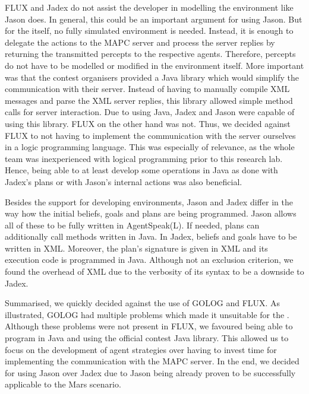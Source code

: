 FLUX and Jadex do not assist the developer in modelling the environment like Jason does.
In general, this could be an important argument for using Jason.
But for the \mars{} itself, no fully simulated environment is needed.
Instead, it is enough to delegate the actions to the MAPC server and process the server replies by returning the transmitted percepts to the respective agents.
Therefore, percepts do not have to be modelled or modified in the environment itself.
More important was that the contest organisers provided a Java library which would simplify the communication with their server.
Instead of having to manually compile XML messages and parse the XML server replies, this library allowed simple method calls for server interaction.
Due to using Java, Jadex and Jason were capable of using this library.
FLUX on the other hand was not.
Thus, we decided against FLUX to not having to implement the communication with the server ourselves in a logic programming language.
This was especially of relevance, as the whole team was inexperienced with logical programming prior to this research lab.
Hence, being able to at least develop some operations in Java as done with Jadex's plans or with Jason's internal actions was also beneficial.

Besides the support for developing environments, Jason and Jadex differ in the way how the initial beliefs, goals and plans are being programmed.
Jason allows all of these to be fully written in AgentSpeak(L).
If needed, plans can additionally call methods written in Java.
In Jadex, beliefs and goals have to be written in XML.
Moreover, the plan's signature is given in XML and its execution code is programmed in Java.
Although not an exclusion criterion, we found the overhead of XML due to the verbosity of its syntax to be a downside to Jadex.

Summarised, we quickly decided against the use of GOLOG and FLUX.
As illustrated, GOLOG had multiple problems which made it unsuitable for the \mars{}.
Although these problems were not present in FLUX, we favoured being able to program in Java and using the official contest Java library.
This allowed us to focus on the development of agent strategies over having to invest time for implementing the communication with the MAPC server.
In the end, we decided for using Jason over Jadex due to Jason being already proven to be successfully applicable to the Mars scenario.
